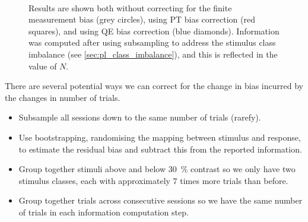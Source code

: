\begin{figure}[htbp]
    \centering
    \hspace*{\fill}
    \hspace*{\fill}\hspace{.2cm}\hspace*{\fill}
    \hspace*{\fill}
    \\
    \hspace*{\fill}
    \hspace*{\fill}\hspace{.2cm}\hspace*{\fill}
    \hspace*{\fill}
    \caption{
Results are shown both without correcting for the finite measurement bias (grey circles), using \ac{PT} bias correction (red squares), and using \ac{QE} bias correction (blue diamonds).
Information was computed after using subsampling to address the stimulus class imbalance (see \autoref{sec:pl_class_imbalance}), and this is reflected in the value of $N$.
}
    \label{fig:IvN}
    \label{fig:I_vs_invN}
\end{figure}


There are several potential ways we can correct for the change in bias incurred by the changes in number of trials.
\begin{itemize}
\item Subsample all sessions down to the same number of trials (rarefy).
\item Use bootstrapping, randomising the mapping between stimulus and response, to estimate the residual bias and subtract this from the reported information.
\item Group together stimuli above and below \SI{30}{\percent} contrast so we only have two stimulus classes, each with approximately \num{7} times more trials than before.
\item Group together trials across consecutive sessions so we have the same number of trials in each information computation step.
\end{itemize}

